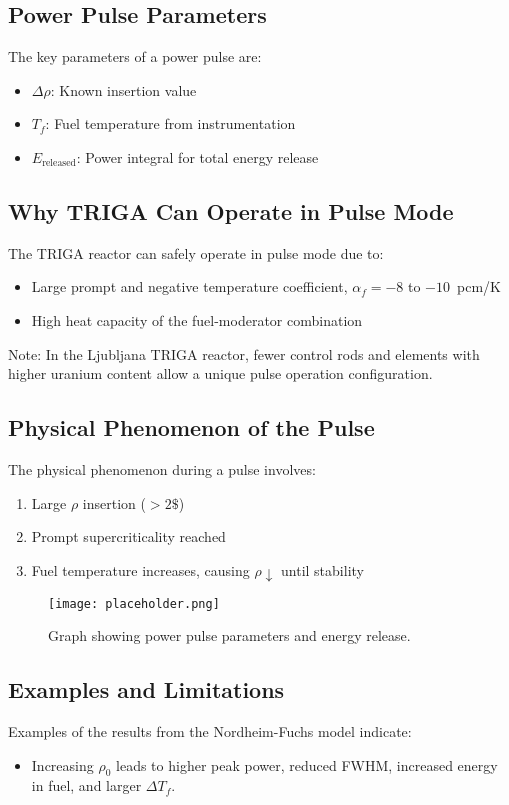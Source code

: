 \subsection{Power Pulse Parameters}
The key parameters of a power pulse are:
\begin{itemize}
    \item $\Delta \rho$: Known insertion value
    \item $T_f$: Fuel temperature from instrumentation
    \item $E_{\text{released}}$: Power integral for total energy release
\end{itemize}

\subsection{Why TRIGA Can Operate in Pulse Mode}
The TRIGA reactor can safely operate in pulse mode due to:
\begin{itemize}
    \item Large prompt and negative temperature coefficient, $\alpha_f = -8$ to $-10$~pcm/K
    \item High heat capacity of the fuel-moderator combination
\end{itemize}
Note: In the Ljubljana TRIGA reactor, fewer control rods and elements with higher uranium content allow a unique pulse operation configuration.

\subsection{Physical Phenomenon of the Pulse}
The physical phenomenon during a pulse involves:
\begin{enumerate}
    \item Large $\rho$ insertion ($> 2\$$)
    \item Prompt supercriticality reached
    \item Fuel temperature increases, causing $\rho \downarrow$ until stability
\end{enumerate}

\begin{figure}[h]
    \centering
    \texttt{[image: placeholder.png]}
    \caption{Graph showing power pulse parameters and energy release.}
    \label{fig:power_pulse}
\end{figure}

\subsection{Examples and Limitations}
Examples of the results from the Nordheim-Fuchs model indicate:
\begin{itemize}
    \item Increasing $\rho_0$ leads to higher peak power, reduced FWHM, increased energy in fuel, and larger $\Delta T_f$.
\end{itemize}

